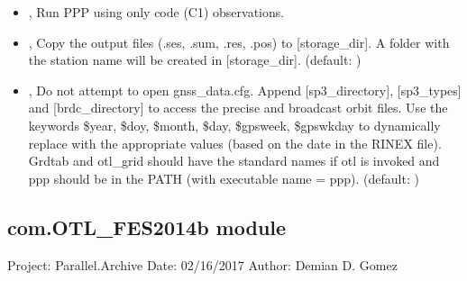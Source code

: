 \documentclass[letterpaper,10pt,english]{sphinxmanual}
\begin{document}
\begin{itemize}
\item {} 
\sphinxAtStartPar
{\hyperref[\detokenize{com:LocateRinex.py--code}]{}}, {\hyperref[\detokenize{com:LocateRinex.py---code_only}]{}} \sphinxhyphen{} Run PPP using only code (C1) observations.

\item {} 
\sphinxAtStartPar
{\hyperref[\detokenize{com:LocateRinex.py--c}]{}} , {\hyperref[\detokenize{com:LocateRinex.py---copy_results}]{}}  \sphinxhyphen{} Copy the output files (.ses, .sum, .res, .pos) to {[}storage\_dir{]}. A folder with the station name will be created in {[}storage\_dir{]}. (default: )

\item {} 
\sphinxAtStartPar
{\hyperref[\detokenize{com:LocateRinex.py--nocfg}]{}} , {\hyperref[\detokenize{com:LocateRinex.py---no_config_file}]{}}  \sphinxhyphen{} Do not attempt to open gnss\_data.cfg. Append {[}sp3\_directory{]}, {[}sp3\_types{]} and {[}brdc\_directory{]} to access the precise and broadcast orbit files. Use the keywords \$year, \$doy, \$month, \$day, \$gpsweek, \$gpswkday to dynamically replace with the appropriate values (based on the date in the RINEX file). Grdtab and otl\_grid should have the standard names if \sphinxhyphen{}otl is invoked and ppp should be in the PATH (with executable name = ppp). (default: )

\end{itemize}


\subsection{com.OTL\_FES2014b module}
\label{\detokenize{com:module-com.OTL_FES2014b}}\label{\detokenize{com:com-otl-fes2014b-module}}
\sphinxAtStartPar
Project: Parallel.Archive
Date: 02/16/2017
Author: Demian D. Gomez
\end{document}
